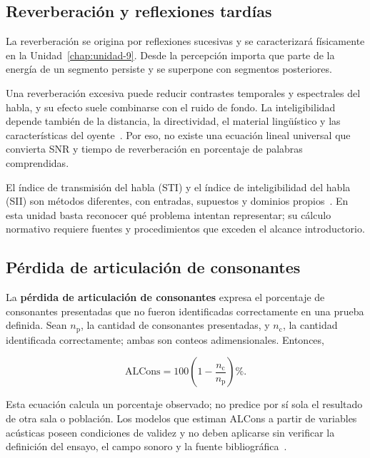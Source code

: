 \subsection{Reverberación y reflexiones tardías}
\label{sec:u7-reverberacion}

La reverberación se origina por reflexiones sucesivas y se caracterizará
físicamente en la Unidad~\ref{chap:unidad-9}. Desde la percepción importa que
parte de la energía
de un segmento persiste y se superpone con segmentos posteriores.

Una reverberación excesiva puede reducir contrastes temporales y
espectrales del habla, y su efecto suele combinarse con el ruido de fondo. La
inteligibilidad depende también de la distancia, la directividad, el material
lingüístico y las características del oyente~\cite{moore2008,moser2009}. Por eso, no existe una ecuación
lineal universal que convierta SNR y tiempo de reverberación en porcentaje de
palabras comprendidas.

El índice de transmisión del habla (STI) y el índice de
inteligibilidad del habla (SII) son métodos diferentes, con entradas, supuestos
y dominios propios~\cite{iec60268_16_2020}. En esta unidad basta reconocer qué problema intentan
representar; su cálculo normativo requiere fuentes y procedimientos que
exceden el alcance introductorio.

\subsection{Pérdida de articulación de consonantes}
\label{sec:u7-alcons}

La \textbf{pérdida de articulación de consonantes} expresa el porcentaje de
consonantes presentadas que no fueron identificadas correctamente en una
prueba definida. Sean \(n_\mathrm{p}\), la cantidad de consonantes
presentadas, y \(n_\mathrm{c}\), la cantidad identificada correctamente; ambas
son conteos adimensionales. Entonces,

\begin{equation}
    \mathrm{ALCons}
      =100\left(1-\frac{n_\mathrm{c}}{n_\mathrm{p}}\right)\%.
    \label{eq:u7-alcons}
\end{equation}

Esta ecuación calcula un porcentaje observado; no predice por sí sola el
resultado de otra sala o población. Los modelos que estiman ALCons a
partir de variables acústicas poseen condiciones de validez y no deben
aplicarse sin verificar la definición del ensayo, el campo sonoro y la fuente
bibliográfica~\cite{iec60268_16_2020,moser2009}.

